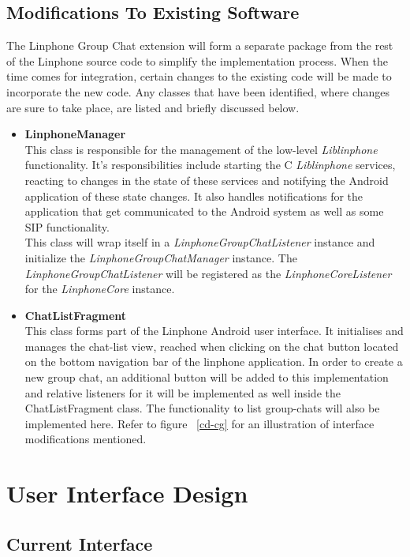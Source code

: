 \documentclass[11pt]{article}
\begin{document}
\subsection{Modifications To Existing Software}
The Linphone Group Chat extension will form a separate package from the rest of the Linphone source code to simplify the implementation process. When the time comes for integration, certain changes to the existing code will be made to incorporate the new code. Any classes that have been identified, where changes are sure to take place, are listed and briefly discussed below.
\begin{itemize}
\item \textbf{LinphoneManager}\\
This class is responsible for the management of the low-level \textit{Liblinphone} functionality. It's responsibilities include starting the C \textit{Liblinphone} services, reacting to changes in the state of these services and notifying the Android application of these state changes. It also handles notifications for the application that get communicated to the Android system as well as some SIP functionality.\\
This class will wrap itself in a \textit{LinphoneGroupChatListener} instance and initialize the \textit{LinphoneGroupChatManager} instance. The \textit{LinphoneGroupChatListener} will be registered as the \textit{LinphoneCoreListener} for the \textit{LinphoneCore} instance.
\item \textbf{ChatListFragment}\\
This class forms part of the Linphone Android user interface. It initialises and manages the chat-list view, reached when clicking on the chat button located on the bottom navigation bar of the linphone application. In order to create a new group chat, an additional button will be added to this implementation and relative listeners for it will be implemented as well inside the ChatListFragment class. The functionality to list group-chats will also be implemented here. Refer to figure ~\ref{cd-cg} for an illustration of interface modifications mentioned.

\end{itemize}

\section{User Interface Design}
\subsection{Current Interface}
\end{document}
